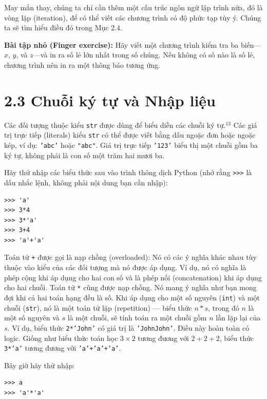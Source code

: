 May mắn thay, chúng ta chỉ cần thêm một cấu trúc ngôn ngữ lập trình nữa, đó là vòng lặp (iteration), để có thể viết các chương trình có độ phức tạp tùy ý. Chúng ta sẽ tìm hiểu điều đó trong Mục 2.4.

\noindent \textbf{Bài tập nhỏ (Finger exercise):} Hãy viết một chương trình kiểm tra ba biến—$x$, $y$, và $z$—và in ra số lẻ lớn nhất trong số chúng. Nếu không có số nào là số lẻ, chương trình nên in ra một thông báo tương ứng.

\section*{2.3 Chuỗi ký tự và Nhập liệu}

\noindent \indent Các đối tượng thuộc kiểu \texttt{str} được dùng để biểu diễn các chuỗi ký tự.$^{13}$ Các giá trị trực tiếp (literals) kiểu \texttt{str} có thể được viết bằng dấu ngoặc đơn hoặc ngoặc kép, ví dụ: \texttt{'abc'} hoặc \texttt{"abc"}. Giá trị trực tiếp \texttt{'123'} biểu thị một chuỗi gồm ba ký tự, không phải là con số một trăm hai mươi ba.

Hãy thử nhập các biểu thức sau vào trình thông dịch Python (nhớ rằng \texttt{>>>} là dấu nhắc lệnh, không phải nội dung bạn cần nhập):

\begin{verbatim}
>>> 'a'
>>> 3*4
>>> 3*'a'
>>> 3+4
>>> 'a'+'a'
\end{verbatim}

Toán tử \texttt{+} được gọi là nạp chồng (overloaded): Nó có các ý nghĩa khác nhau tùy thuộc vào kiểu của các đối tượng mà nó được áp dụng. Ví dụ, nó có nghĩa là phép cộng khi áp dụng cho hai con số và là phép nối (concatenation) khi áp dụng cho hai chuỗi. Toán tử \texttt{*} cũng được nạp chồng. Nó mang ý nghĩa như bạn mong đợi khi cả hai toán hạng đều là số. Khi áp dụng cho một số nguyên (\texttt{int}) và một chuỗi (\texttt{str}), nó là một toán tử lặp (repetition) — biểu thức $n*s$, trong đó $n$ là một số nguyên và $s$ là một chuỗi, sẽ tính toán ra một chuỗi gồm $n$ lần lặp lại của $s$. Ví dụ, biểu thức \texttt{2*'John'} có giá trị là \texttt{'JohnJohn'}. Điều này hoàn toàn có logic. Giống như biểu thức toán học $3 \times 2$ tương đương với $2+2+2$, biểu thức \texttt{3*'a'} tương đương với \texttt{'a'+'a'+'a'}.

Bây giờ hãy thử nhập:

\begin{verbatim}
>>> a
>>> 'a'*'a'
\end{verbatim}

